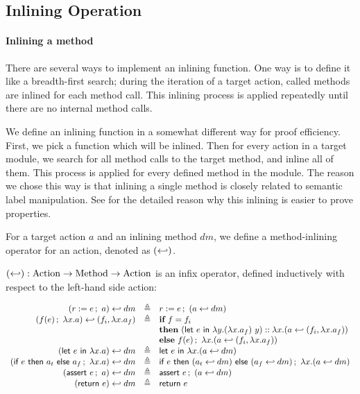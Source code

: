 \subsection{Inlining Operation}

\paragraph{Inlining a method}
There are several ways to implement an inlining function. One way is
to define it like a breadth-first search; during the iteration of a
target action, called methods are inlined for each method call. This
inlining process is applied repeatedly until there are no internal
method calls.

We define an inlining function in a somewhat different way for proof
efficiency. First, we pick a function which will be inlined. Then for
every action in a target module, we search for all method calls to the
target method, and inline all of them. This process is applied for
every defined method in the module. The reason we chose this way is
that inlining a single method is closely related to semantic label
manipulation. See  for the detailed reason
why this inlining is easier to prove properties.

For a target action $a$ and an inlining method $dm$, we define a
method-inlining operator for an action, denoted as $(\inlinedmsymb)$.

\begin{definition}
  \label{def-inlinedm}
  $(\inlinedmsymb) : \textrm{Action} \to \textrm{Method} \to
  \textrm{Action}$ is an infix operator, defined inductively with
  respect to the left-hand side action:
  \begin{center}
    \begin{math}
      \begin{array}{rcl}
        \inlinedm{(\actwrite{r}{e}{a})}{dm} & \triangleq &
        \actwrite{r}{e}{(\inlinedm{a}{dm})} \\
        \inlinedm{(\actcall{x}{f}{e}{a})}{(f_i, \lambda x.a_f)} & \triangleq &
        \pgmif{} f = f_i \\
        & & \pgmthen{} \concataction{(\actlet{e}{y}{(\lambda x.a_f)\ y})}{(\inlinedm{a}{(f_i, \lambda x.a_f)})} \\
        & & \pgmelse{} \actcall{x}{f}{e}{(\inlinedm{a}{(f_i, \lambda x.a_f)})} \\
        \inlinedm{(\actlet{e}{x}{a})}{dm} & \triangleq &
        \actlet{e}{x}{(\inlinedm{a}{dm})} \\
        \inlinedm{(\actifelse{e}{a_t}{a_f}{x}{a})}{dm} & \triangleq &
        \actifelse{e}{(\inlinedm{a_t}{dm})}{(\inlinedm{a_f}{dm})}{x}{(\inlinedm{a}{dm})} \\
        \inlinedm{(\actassert{e}{a})}{dm} & \triangleq &
        \actassert{e}{(\inlinedm{a}{dm})} \\
        \inlinedm{(\actret{e})}{dm} & \triangleq & \actret{e} \\
      \end{array}
    \end{math}
  \end{center}
\end{definition}

